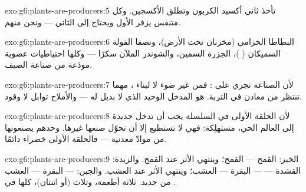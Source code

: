 \begin{solution}{exo:g6:plants-are-producers:5}
تأخذ ثاني أكسيد الكربون وتطلق الأكسجين. وكل  متنفس يزفر
الأول ويحتاج إلى الثاني --- ونحن منهم.
\end{solution}

\begin{solution}{exo:g6:plants-are-producers:6}
 البطاطا  الخزامى (مخزنان تحت الأرض)، ونصفا الفولة
السميكان ( )،  الجزرة السمين، والشوندر الملآن
سكرًا --- وكلها احتياطيات عضوية مودَعة من صناعة الصيف.
\end{solution}

\begin{solution}{exo:g6:plants-are-producers:7}
لأن الصناعة تجري على : فمن غير ضوء لا  لبناء ، مهما تنتظر من معادن في التربة.  هو المدخل الوحيد
الذي لا بديل له --- والأملاح توابل لا وقود.
\end{solution}

\begin{solution}{exo:g6:plants-are-producers:8}
لأن الحلقة الأولى في السلسلة يجب أن تدخل  جديدة إلى
العالم الحي،  مستهلِكة: فهي لا تستطيع إلا أن تحوّل  صنعها غيرها.  وحدهم يصنعونها من موادّ معدنية ---
فالحلقة الأولى خضراء دائمًا.
\end{solution}

\begin{solution}{exo:g6:plants-are-producers:9}
الخبز: القمح ---   القمح؛ وينتهي الأثر عند  القمح.
والزبدة: القشدة ---  --- البقرة --- العشب؛ وينتهي الأثر عند
 العشب. والجبن:  --- البقرة --- العشب من جديد. ثلاثة
أطعمة، وثلاث  (أو اثنتان)، كلها في .
\end{solution}

